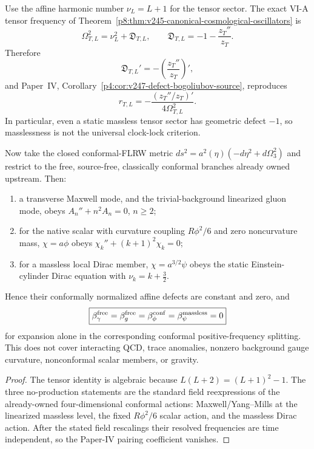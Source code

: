\documentclass[12pt,a4paper]{article}
\begin{document}
\begin{theorem}
\label{p8:thm:v247-cosmological-affine-defect}
Use the affine harmonic number \(\nu_L=L+1\) for the tensor sector.  The exact
VI-A tensor frequency of
Theorem~\ref{p8:thm:v245-canonical-cosmological-oscillators} is
\[
 \Omega_{T,L}^2=\nu_L^2+\mathfrak D_{T,L},
 \qquad
 \boxed{\mathfrak D_{T,L}=-1-\frac{z_T''}{z_T}.}
\]
Therefore
\[
 \boxed{\mathfrak D_{T,L}'=-\left(\frac{z_T''}{z_T}\right)'},
\]
and Paper~IV, Corollary~\ref{p4:cor:v247-defect-bogoliubov-source}, reproduces
\[
 r_{T,L}=-\frac{(z_T''/z_T)'}{4\Omega_{T,L}^2}.
\]
In particular, even a static massless tensor sector has geometric defect
\(-1\), so masslessness is not the universal clock-lock criterion.

Now take the closed conformal-FLRW metric
\(ds^2=a^2(\eta)(-d\eta^2+d\Omega_3^2)\) and restrict to the free,
source-free, classically conformal branches already owned upstream.  Then:
\begin{enumerate}[label=(\roman*),leftmargin=2.2em]
\item a transverse Maxwell mode, and the trivial-background linearized gluon
      mode, obeys \(A_n''+n^2A_n=0\), \(n\ge2\);
\item for the native scalar with curvature coupling \(R\phi^2/6\) and zero
      noncurvature mass, \(\chi=a\phi\) obeys
      \(\chi_k''+(k+1)^2\chi_k=0\);
\item for a massless local Dirac member, \(\chi=a^{3/2}\psi\) obeys the
      static Einstein-cylinder Dirac equation with
      \(\nu_k=k+\tfrac32\).
\end{enumerate}
Hence their conformally normalized affine defects are constant and zero, and
\[
 \boxed{\beta_{\gamma}^{\rm free}=\beta_g^{\rm free}
 =\beta_{\phi}^{\rm conf}=\beta_{\psi}^{\rm massless}=0}
\]
for expansion alone in the corresponding conformal positive-frequency
splitting.  This does not cover interacting QCD, trace anomalies, nonzero
background gauge curvature, nonconformal scalar members, or gravity.
\end{theorem}

\begin{proof}
The tensor identity is algebraic because
\(L(L+2)=(L+1)^2-1\).  The three no-production statements are the standard
field reexpressions of the already-owned four-dimensional conformal actions:
Maxwell/Yang--Mills at the linearized massless level, the fixed
\(R\phi^2/6\) scalar action, and the massless Dirac action.  After the stated
field rescalings their resolved frequencies are time independent, so the
Paper-IV pairing coefficient vanishes.
\end{proof}
\end{document}
